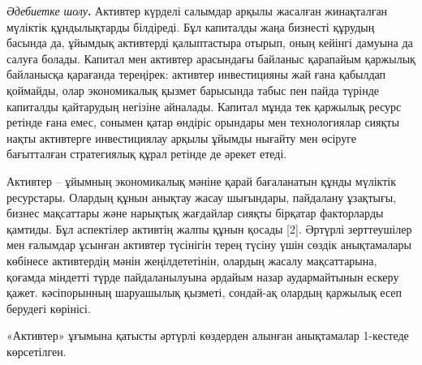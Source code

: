 \begin{multicols}{2}
\emph{Әдебиетке шолу}{\bfseries .} Активтер күрделі салымдар арқылы
жасалған жинақталған мүліктік құндылықтарды білдіреді. Бұл капиталды
жаңа бизнесті құрудың басында да, ұйымдық активтерді қалыптастыра
отырып, оның кейінгі дамуына да салуға болады. Капитал мен активтер
арасындағы байланыс қарапайым қаржылық байланысқа қарағанда тереңірек:
активтер инвестицияны жай ғана қабылдап қоймайды, олар экономикалық
қызмет барысында табыс пен пайда түрінде капиталды қайтарудың негізіне
айналады. Капитал мұнда тек қаржылық ресурс ретінде ғана емес, сонымен
қатар өндіріс орындары мен технологиялар сияқты нақты активтерге
инвестициялау арқылы ұйымды нығайту мен өсіруге бағытталған стратегиялық
құрал ретінде де әрекет етеді.

Активтер -- ұйымның экономикалық мәніне қарай бағаланатын құнды мүліктік
ресурстары. Олардың құнын анықтау жасау шығындары, пайдалану ұзақтығы,
бизнес мақсаттары және нарықтық жағдайлар сияқты бірқатар факторларды
қамтиды. Бұл аспектілер активтің жалпы құнын қосады {[}2{]}. Әртүрлі
зерттеушілер мен ғалымдар ұсынған активтер түсінігін терең түсіну үшін
сөздік анықтамалары көбінесе активтердің мәнін жеңілдететінін, олардың
жасалу мақсаттарына, қоғамда міндетті түрде пайдаланылуына әрдайым назар
аудармайтынын ескеру қажет. кәсіпорынның шаруашылық қызметі, сондай-ақ
олардың қаржылық есеп берудегі көрінісі.

«Активтер» ұғымына қатысты әртүрлі көздерден алынған анықтамалар
1-кестеде көрсетілген.
\end{multicols}

